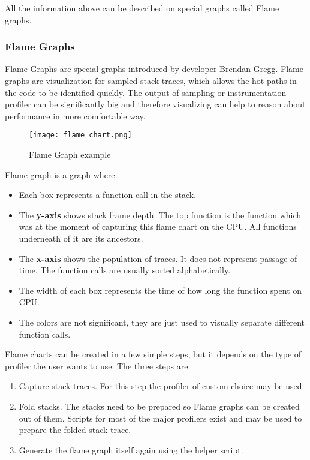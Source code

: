 All the information above can be described on special graphs called Flame graphs.
\subsubsection{Flame Graphs}
Flame Graphs are special graphs introduced by developer Brendan Gregg. Flame graphs are visualization for sampled stack traces, which allows the hot paths in the code to be identified quickly. The output of sampling or instrumentation profiler can be significantly big and therefore visualizing can help to reason about performance in more comfortable way. 

\begin{figure}
	\centering
	\texttt{[image: flame\_chart.png]}
	\caption{Flame Graph example}
	\label{fig:flame_chart}
\end{figure}
Flame graph is a graph where:
\begin{itemize}
	\item Each box represents a function call in the stack.
	\item The \textbf{y-axis} shows stack frame depth. The top function is the function which was at the moment of capturing this flame chart on the CPU. All functions underneath of it are its ancestors.
	\item The \textbf{x-axis} shows the population of traces. It does not represent passage of time. The function calls are usually sorted alphabetically.
	\item The width of each box represents the time of how long the function spent on CPU.
	\item The colors are not significant, they are just used to visually separate different function calls.
\end{itemize}

Flame charts can be created in a few simple steps, but it depends on the type of profiler the user wants to use. The three steps are:
\begin{enumerate}
	\item Capture stack traces. For this step the profiler of custom choice may be used.
	\item Fold stacks. The stacks need to be prepared so Flame graphs can be created out of them. Scripts for most of the major profilers exist and may be used to prepare the folded stack trace.
	\item Generate the flame graph itself again using the helper script.
\end{enumerate}

